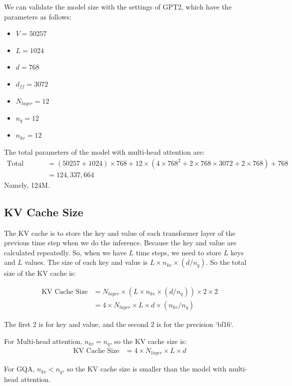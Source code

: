 \documentclass[a4paper,12pt]{article}
\begin{document}
We can validate the model size with the settings of GPT2, which have the parameters as follows:

\begin{itemize}
    \item $V = 50257$
    \item $L = 1024$
    \item $d = 768$
    \item $d_{ff} = 3072$
    \item $N_{layer} = 12$
    \item $n_q = 12$ 
    \item $n_{kv} = 12$
\end{itemize}

The total parameters of the model with multi-head attention are:
\begin{align}
    \text{Total Parameters} &= (50257 + 1024) \times 768 + 12 \times (4 \times 768^2 + 2 \times 768 \times 3072 + 2 \times 768) + 768 \\
    &= 124,337,664
\end{align}
Namely, 124M.

\subsection{KV Cache Size}

The KV cache is to store the key and value of each transformer layer of the previous time step when we do the inference. Because the key and value are calculated repeatedly. So, when we have $L$ time steps, we need to store $L$ keys and $L$ values. The size of each key and value is $L \times n_{kv} \times (d/n_q) $. So the total size of the KV cache is:

\begin{align}
    \text{KV Cache Size} &=N_{layer} \times (L \times n_{kv} \times (d/n_q) )\times  2 \times 2 \\
    &= 4 \times N_{layer} \times L \times d \times (n_{kv}/n_q)
\end{align}

The first $2$ is for key and value, and the second $2$ is for the precision `bf16`.

For Multi-head attention, $n_{kv} = n_q$, so the KV cache size is:
\begin{align}
    \text{KV Cache Size} &= 4 \times N_{layer} \times L \times d
\end{align}

For GQA, $n_{kv} < n_q$, so the KV cache size is smaller than the model with multi-head attention.
\end{document}
